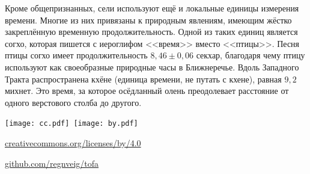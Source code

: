 Кроме общепризнанных, сели используют ещё и локальные единицы измерения времени.
Многие из них привязаны к природным явлениям, имеющим жёстко закреплённую временную продолжительность.
Одной из таких единиц является согхо, которая пишется с иероглифом <<время>> вместо <<птицы>>.
Песня птицы согхо имеет продолжительность $8,46\pm0,06$ секхар, благодаря чему птицу используют как своеобразные природные часы в Ближнеречье.
Вдоль Западного Тракта распространена кхёне (единица времени, не путать с кхене), равная $9,2$ михнет.
Это время, за которое осёдланный олень преодолевает расстояние от одного верстового столба до другого.

\newpage\thispagestyle{plain}
{\centering

\texttt{[image: cc.pdf]}~\texttt{[image: by.pdf]}

\vspace{0.2em}

{\par}
{ \href{https://creativecommons.org/licenses/by/4.0/deed.ru}{creativecommons.org/licenses/by/4.0}\par}

\vfill

{\large\bookauthor\par}
\vspace{0.5em}
{\Large\textbf{\booktitle}\par}

\vfill

{ \textit{\bookstarted}\par}
{ \textit{\bookfinished}\par}
{ \href{https://github.com/regnveig/tofa}{github.com/regnveig/tofa}\par}

\vfill

{\par}
{\par}
{\par}

}
